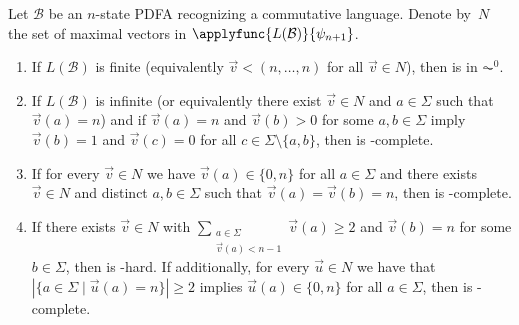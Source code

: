 \begin{theorem}
	\label{constr_sync:thm:comm}
	Let $\mathcal B$ be an $n$-state PDFA recognizing a commutative language.
	Denote by~$N$ the set of maximal vectors in $\applyfunc{L(\mathcal B)}{\psi_{n+1}}$.
	
	\begin{enumerate}
		\item \label{item:comm:finite} If $L(\mathcal B)$ is finite (equivalently $\vec{v} < (n, \ldots, n)$ for all $\vec{v} \in N$),
		then  is in $\AC^0$.
		
		\item \label{item:comm:LOGSPACE} If $L(\mathcal B)$ is infinite (or equivalently there exist $\vec{v} \in N$ and $a \in \Sigma$ such that $\vec{v}(a) = n$)
		and if $\vec{v}(a) = n$ and $\vec{v}(b) > 0$ for some $a,b \in \Sigma$
		imply $\vec{v}(b) = 1$ and $\vec{v}(c) = 0$ for all $c \in \Sigma \setminus \{a,b\}$,
		then  is \LOGSPACE-complete.

		
		\item \label{item:comm:NL} If for every $\vec{v} \in N$ we have $\vec{v}(a) \in \{0,n\}$ for all $a \in \Sigma$
		and there exists $\vec{v} \in N$ and distinct $a,b \in \Sigma$ such that $\vec{v}(a) = \vec{v}(b) = n$,
		then  is \NL-complete. 
		
		\item \label{item:comm:NP}
		If there exists $\vec{v} \in N$
		with $\sum_{\substack{a \in \Sigma \\ \vec{v}(a) < n - 1}} \vec{v}(a) \ge 2$
		and $\vec{v}(b) = n$ for some $b \in \Sigma$,
		then  is \NP-hard.
%			
%		
		If additionally, 
		for every $\vec{u} \in N$
		we have that $|\{ a \in \Sigma \mid \vec{u}(a) = n \}| \ge 2$
		implies $\vec{u}(a) \in \{0,n\}$ for all $a \in \Sigma$, then  
		is \NP-complete.
		

\end{enumerate}
\end{theorem}
